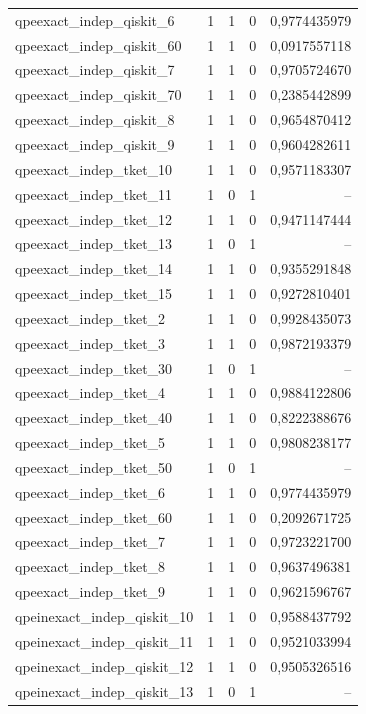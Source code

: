 \begin{longtable}{lrrrr}
qpeexact\_indep\_qiskit\_6 & 1 & 1 & 0 & 0,9774435979 \\
qpeexact\_indep\_qiskit\_60 & 1 & 1 & 0 & 0,0917557118 \\
qpeexact\_indep\_qiskit\_7 & 1 & 1 & 0 & 0,9705724670 \\
qpeexact\_indep\_qiskit\_70 & 1 & 1 & 0 & 0,2385442899 \\
qpeexact\_indep\_qiskit\_8 & 1 & 1 & 0 & 0,9654870412 \\
qpeexact\_indep\_qiskit\_9 & 1 & 1 & 0 & 0,9604282611 \\
qpeexact\_indep\_tket\_10 & 1 & 1 & 0 & 0,9571183307 \\
qpeexact\_indep\_tket\_11 & 1 & 0 & 1 & -- \\
qpeexact\_indep\_tket\_12 & 1 & 1 & 0 & 0,9471147444 \\
qpeexact\_indep\_tket\_13 & 1 & 0 & 1 & -- \\
qpeexact\_indep\_tket\_14 & 1 & 1 & 0 & 0,9355291848 \\
qpeexact\_indep\_tket\_15 & 1 & 1 & 0 & 0,9272810401 \\
qpeexact\_indep\_tket\_2 & 1 & 1 & 0 & 0,9928435073 \\
qpeexact\_indep\_tket\_3 & 1 & 1 & 0 & 0,9872193379 \\
qpeexact\_indep\_tket\_30 & 1 & 0 & 1 & -- \\
qpeexact\_indep\_tket\_4 & 1 & 1 & 0 & 0,9884122806 \\
qpeexact\_indep\_tket\_40 & 1 & 1 & 0 & 0,8222388676 \\
qpeexact\_indep\_tket\_5 & 1 & 1 & 0 & 0,9808238177 \\
qpeexact\_indep\_tket\_50 & 1 & 0 & 1 & -- \\
qpeexact\_indep\_tket\_6 & 1 & 1 & 0 & 0,9774435979 \\
qpeexact\_indep\_tket\_60 & 1 & 1 & 0 & 0,2092671725 \\
qpeexact\_indep\_tket\_7 & 1 & 1 & 0 & 0,9723221700 \\
qpeexact\_indep\_tket\_8 & 1 & 1 & 0 & 0,9637496381 \\
qpeexact\_indep\_tket\_9 & 1 & 1 & 0 & 0,9621596767 \\
qpeinexact\_indep\_qiskit\_10 & 1 & 1 & 0 & 0,9588437792 \\
qpeinexact\_indep\_qiskit\_11 & 1 & 1 & 0 & 0,9521033994 \\
qpeinexact\_indep\_qiskit\_12 & 1 & 1 & 0 & 0,9505326516 \\
qpeinexact\_indep\_qiskit\_13 & 1 & 0 & 1 & -- \\

\end{longtable}
